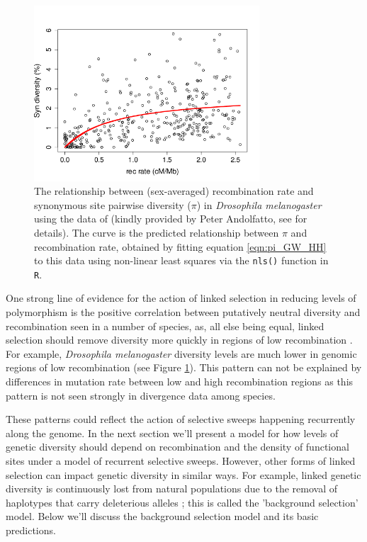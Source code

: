 \begin{figure}
\begin{center}
\includegraphics[width=0.75\textwidth]{figures/Genomewide_HH.png}
\end{center}
\caption{The relationship between (sex-averaged) recombination rate and synonymous
  site pairwise diversity ($\pi$) in {\it Drosophila melanogaster}
  using the data of \citep{Shapiro:07} (kindly provided by Peter
  Andolfatto, see \citet{sella2009pervasive} for details). The curve is the
  predicted relationship between $\pi$ and recombination rate, obtained
  by fitting equation \eqref{eqn:pi_GW_HH} to this data 
 using non-linear least squares via the {\tt nls()} function in {\tt R}.} \label{fig:GW_hitchhiking_reduction}
\end{figure}

One strong line of evidence for the action of linked selection in reducing levels of
polymorphism is the positive correlation between putatively
neutral diversity and recombination seen in a number of species, as, all
else being equal, linked selection should remove diversity more quickly in regions of low recombination 
\citep{Aguade:89,Begun:92,Wiehe:93,Cutter:10,Cai:09}. For example, {\it Drosophila melanogaster} diversity
levels are much lower in genomic regions of low recombination (see
Figure \ref{fig:GW_hitchhiking_reduction}). This pattern can not be
explained by differences in mutation rate between low and high
recombination regions as this pattern is not seen strongly in
divergence data among species.

These patterns could reflect the action of selective sweeps happening
recurrently along the genome. In the next section we'll present a model for how levels of
genetic diversity should depend on recombination and the density of
functional sites under a model of recurrent selective sweeps.
However, other forms of linked selection can impact genetic
diversity in similar ways. For example, linked genetic diversity is
continuously lost from natural populations due to the removal of
haplotypes that carry deleterious alleles
\citep{Charlesworth:95,Hudson:95}; this is called the 'background selection'
model. Below we'll discuss the background selection model and its
basic predictions.

